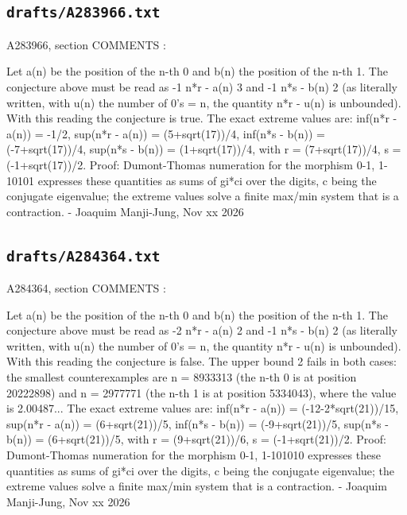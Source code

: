 \subsection*{\texttt{drafts/A283966.txt}}
{\small\raggedright\ttfamily
A283966, section COMMENTS :\par
\par
Let a(n) be the position of the n-th 0 and b(n) the position of the n-th 1. The conjecture above must be read as -1  n*r - a(n)  3 and -1  n*s - b(n)  2 (as literally written, with u(n) the number of 0's = n, the quantity n*r - u(n) is unbounded). With this reading the conjecture is true. The exact extreme values are: inf(n*r - a(n)) = -1/2, sup(n*r - a(n)) = (5+sqrt(17))/4, inf(n*s - b(n)) = (-7+sqrt(17))/4, sup(n*s - b(n)) = (1+sqrt(17))/4, with r = (7+sqrt(17))/4, s = (-1+sqrt(17))/2. Proof: Dumont-Thomas numeration for the morphism 0-1, 1-10101 expresses these quantities as sums of gi*ci over the digits, c being the conjugate eigenvalue; the extreme values solve a finite max/min system that is a contraction. - Joaquim Manji-Jung, Nov xx 2026\par
}
\subsection*{\texttt{drafts/A284364.txt}}
{\small\raggedright\ttfamily
A284364, section COMMENTS :\par
\par
Let a(n) be the position of the n-th 0 and b(n) the position of the n-th 1. The conjecture above must be read as -2  n*r - a(n)  2 and -1  n*s - b(n)  2 (as literally written, with u(n) the number of 0's = n, the quantity n*r - u(n) is unbounded). With this reading the conjecture is false. The upper bound 2 fails in both cases: the smallest counterexamples are n = 8933313 (the n-th 0 is at position 20222898) and n = 2977771 (the n-th 1 is at position 5334043), where the value is 2.00487... The exact extreme values are: inf(n*r - a(n)) = (-12-2*sqrt(21))/15, sup(n*r - a(n)) = (6+sqrt(21))/5, inf(n*s - b(n)) = (-9+sqrt(21))/5, sup(n*s - b(n)) = (6+sqrt(21))/5, with r = (9+sqrt(21))/6, s = (-1+sqrt(21))/2. Proof: Dumont-Thomas numeration for the morphism 0-1, 1-101010 expresses these quantities as sums of gi*ci over the digits, c being the conjugate eigenvalue; the extreme values solve a finite max/min system that is a contraction. - Joaquim Manji-Jung, Nov xx 2026\par
}
